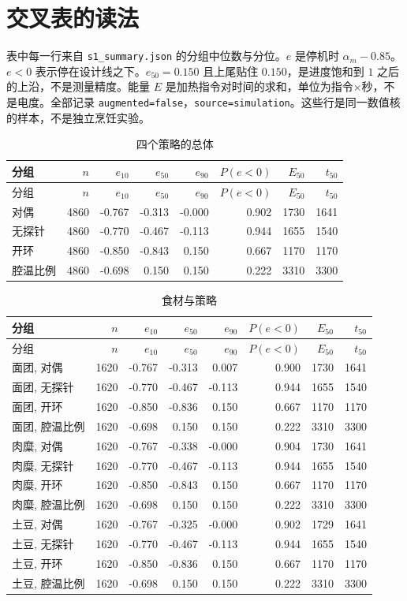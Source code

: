 \section{交叉表的读法}
表中每一行来自 \texttt{s1\_summary.json} 的分组中位数与分位。$e$ 是停机时 $\alpha_m-0.85$。$e{<}0$ 表示停在设计线之下。$e_{50}=0.150$ 且上尾贴住 $0.150$，是进度饱和到 $1$ 之后的上沿，不是测量精度。能量 $E$ 是加热指令对时间的求和，单位为指令$\times$秒，不是电度。全部记录 \texttt{augmented=false}，\texttt{source=simulation}。这些行是同一数值核的样本，不是独立烹饪实验。
\begin{longtable}{lrrrrrrr}
\caption{四个策略的总体}\\
\toprule
分组 & $n$ & $e_{10}$ & $e_{50}$ & $e_{90}$ & $P(e{<}0)$ & $E_{50}$ & $t_{50}$ \\
\midrule
\endfirsthead
\toprule
分组 & $n$ & $e_{10}$ & $e_{50}$ & $e_{90}$ & $P(e{<}0)$ & $E_{50}$ & $t_{50}$ \\
\midrule
\endhead
对偶 & 4860 & -0.767 & -0.313 & -0.000 & 0.902 & 1730 & 1641 \\
无探针 & 4860 & -0.770 & -0.467 & -0.113 & 0.944 & 1655 & 1540 \\
开环 & 4860 & -0.850 & -0.843 & 0.150 & 0.667 & 1170 & 1170 \\
腔温比例 & 4860 & -0.698 & 0.150 & 0.150 & 0.222 & 3310 & 3300 \\
\bottomrule
\end{longtable}

\begin{longtable}{lrrrrrrr}
\caption{食材与策略}\\
\toprule
分组 & $n$ & $e_{10}$ & $e_{50}$ & $e_{90}$ & $P(e{<}0)$ & $E_{50}$ & $t_{50}$ \\
\midrule
\endfirsthead
\toprule
分组 & $n$ & $e_{10}$ & $e_{50}$ & $e_{90}$ & $P(e{<}0)$ & $E_{50}$ & $t_{50}$ \\
\midrule
\endhead
面团, 对偶 & 1620 & -0.767 & -0.313 & 0.007 & 0.900 & 1730 & 1641 \\
面团, 无探针 & 1620 & -0.770 & -0.467 & -0.113 & 0.944 & 1655 & 1540 \\
面团, 开环 & 1620 & -0.850 & -0.836 & 0.150 & 0.667 & 1170 & 1170 \\
面团, 腔温比例 & 1620 & -0.698 & 0.150 & 0.150 & 0.222 & 3310 & 3300 \\
肉糜, 对偶 & 1620 & -0.767 & -0.338 & -0.000 & 0.904 & 1730 & 1641 \\
肉糜, 无探针 & 1620 & -0.770 & -0.467 & -0.113 & 0.944 & 1655 & 1540 \\
肉糜, 开环 & 1620 & -0.850 & -0.843 & 0.150 & 0.667 & 1170 & 1170 \\
肉糜, 腔温比例 & 1620 & -0.698 & 0.150 & 0.150 & 0.222 & 3310 & 3300 \\
土豆, 对偶 & 1620 & -0.767 & -0.325 & -0.000 & 0.902 & 1729 & 1641 \\
土豆, 无探针 & 1620 & -0.770 & -0.467 & -0.113 & 0.944 & 1655 & 1540 \\
土豆, 开环 & 1620 & -0.850 & -0.836 & 0.150 & 0.667 & 1170 & 1170 \\
土豆, 腔温比例 & 1620 & -0.698 & 0.150 & 0.150 & 0.222 & 3310 & 3300 \\
\bottomrule
\end{longtable}


